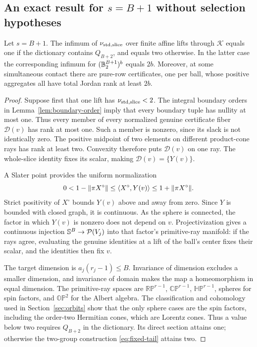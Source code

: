 \subsection{An exact result for \texorpdfstring{$s=B+1$}{s=B+1} without selection hypotheses}
\begin{theorem}\label{thm:one-channel}
Let $s=B+1$. The infimum of $\nu_{\mathrm{std},\mathrm{slice}}$ over finite affine lifts through
$\mathscr K$ equals one if the dictionary contains $Q_{B+2}$, and equals
two otherwise. In the latter case the corresponding infimum for
$(\mathbb B_2^{B+1})^b$ equals $2b$. Moreover, at some simultaneous contact
there are pure-row certificates, one per ball, whose positive
aggregates all have total Jordan rank at least $2b$.
\end{theorem}
\begin{proof}
Suppose first that one lift has $\nu_{\mathrm{std},\mathrm{slice}}<2$. The integral boundary orders
in Lemma~\ref{lem:boundary-order} imply that every boundary tuple has
nullity at most one. Thus every member of every normalized genuine
certificate fiber $\mathcal D(v)$ has rank at most one. Such a member is
nonzero, since its slack is not identically zero. The positive midpoint
of two elements on different product-cone rays has rank at least two.
Convexity therefore puts $\mathcal D(v)$ on one ray. The whole-slice
identity fixes its scalar, making $\mathcal D(v)=\{Y(v)\}$.

A Slater point provides the uniform normalization
\[
 0<1-\lVert \pi X^\circ\rVert\leq\langle X^\circ,Y(v)\rangle
 \leq1+\lVert \pi X^\circ\rVert.
\]
Strict positivity of $X^\circ$ bounds $Y(v)$ above and away from zero.
Since $Y$ is bounded with closed graph, it is continuous. As the
sphere is connected, the factor in which $Y(v)$ is nonzero does not
depend on $v$. Projectivization gives a continuous injection
$\mathbb S^B\to\mathcal P(V_j)$ into that factor's primitive-ray manifold:
if the rays agree, evaluating the genuine identities at a lift of the
ball's center fixes their scalar, and the identities then fix $v$.

The target dimension is $a_j(r_j-1)\leq B$. Invariance of dimension
excludes a smaller dimension, and invariance of domain makes the map a
homeomorphism in equal dimension. The primitive-ray spaces are
$\mathbb{RP}^{r-1}$, $\mathbb{CP}^{r-1}$,
$\mathbb{HP}^{r-1}$, spheres for spin factors, and $\mathbb{OP}^2$ for
the Albert algebra. The classification and cohomology used in
Section~\ref{sec:orbits} show that the only sphere cases are the spin
factors, including the order-two Hermitian cones, which are Lorentz
cones. Thus a value below two requires $Q_{B+2}$ in the dictionary. Its
direct section
attains one; otherwise the two-group construction
\eqref{eq:fixed-tail} attains two.


\end{proof}
